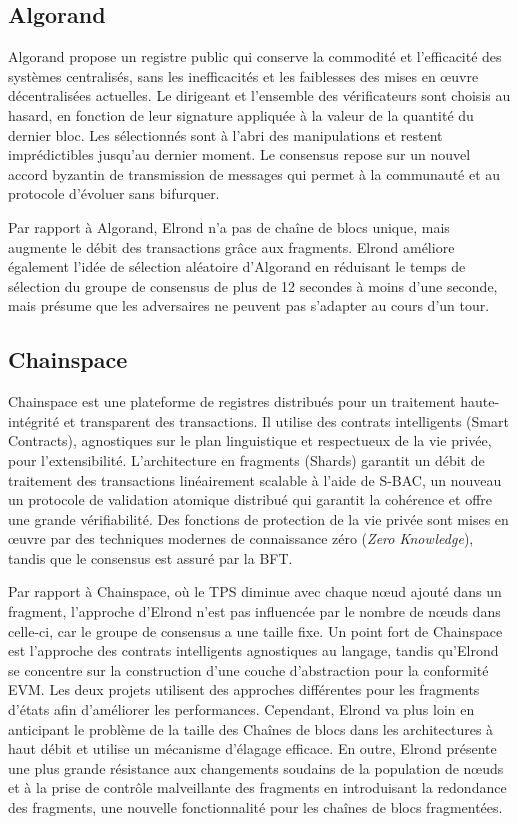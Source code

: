 \documentclass[journal]{IEEEtran}
\begin{document}
\subsection{Algorand}
Algorand \cite{3} propose un registre public qui conserve la commodité et l'efficacité des systèmes centralisés, sans les inefficacités et les faiblesses des mises en œuvre décentralisées actuelles. Le dirigeant et l'ensemble des vérificateurs sont choisis au hasard, en fonction de leur signature appliquée à la valeur de la quantité du dernier bloc. Les sélectionnés sont à l'abri des manipulations et restent imprédictibles jusqu'au dernier moment. Le consensus repose sur un nouvel accord byzantin de transmission de messages qui permet à la communauté et au protocole d'évoluer sans bifurquer. 

Par rapport à Algorand, Elrond n'a pas de chaîne  de blocs unique, mais augmente le débit des transactions grâce aux fragments. Elrond améliore également l'idée de sélection aléatoire d'Algorand en réduisant le temps de sélection du groupe de consensus de plus de 12 secondes à moins d'une seconde, mais présume que les adversaires ne peuvent pas s'adapter au cours d'un tour.

\subsection{Chainspace}
Chainspace \cite{9} est une plateforme de registres distribués pour un traitement haute-intégrité et transparent des transactions. Il utilise des contrats intelligents (Smart Contracts), agnostiques sur le plan linguistique et respectueux de la vie privée, pour l'extensibilité. L'architecture en fragments (Shards) garantit un débit de traitement des transactions linéairement scalable à l'aide de S-BAC, un nouveau un protocole de validation atomique distribué qui garantit la cohérence et offre une grande vérifiabilité. Des fonctions de protection de la vie privée sont mises en œuvre par des techniques modernes de connaissance zéro (\textit{Zero Knowledge}), tandis que le consensus est assuré par la BFT.

Par rapport à Chainspace, où le TPS diminue avec chaque nœud ajouté dans un fragment, l'approche d'Elrond n'est pas influencée par le nombre de nœuds dans celle-ci, car le groupe de consensus a une taille fixe. Un point fort de Chainspace est l'approche des contrats intelligents agnostiques au langage, tandis qu'Elrond se concentre sur la construction d'une couche d'abstraction pour la conformité EVM. Les deux projets utilisent des approches différentes pour les fragments d’états afin d'améliorer les performances. Cependant, Elrond va plus loin en anticipant le problème de la taille des Chaînes de blocs dans les architectures à haut débit et utilise un mécanisme d'élagage efficace. En outre, Elrond présente une plus grande résistance aux changements soudains de la population de nœuds et à la prise de contrôle malveillante des fragments en introduisant la redondance des fragments, une nouvelle fonctionnalité pour les chaînes de blocs fragmentées.
\end{document}
